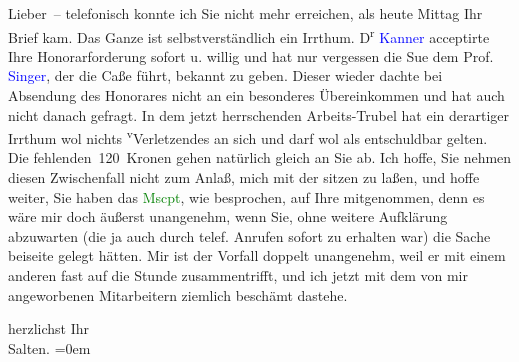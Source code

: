 \pstart
           Lieber – telefonisch konnte ich Sie nicht mehr erreichen, als heute{ }Mittag Ihr Brief kam. Das Ganze ist selbstverständlich ein Irrthum. D\textsuperscript{r}{ }\textcolor{blue}{Kanner}{}\ledrightnote{\textcolor{blue}{Heinrich Kanner}} acceptirte \label{K_L03333-1v}\label{K_L03333-1h} Ihre Honorarforderung sofort u. willig und hat nur vergessen die Su{\geminationm}e dem Prof. \textcolor{blue}{Singer}{}\ledrightnote{\textcolor{blue}{Isidor Singer}}, der die Caße führt, bekannt zu geben. Dieser wieder dachte bei
               Absendung des Honorares nicht an ein besonderes Übereinkommen und hat auch nicht
               danach gefragt. In dem jetzt herrschenden Arbeits-Trubel hat ein derartiger Irrthum
               wol nichts \substVorne{}\textsuperscript{v}\substDazwischen{}V\substHinten{}erletzendes an sich und darf wol als entschuldbar gelten. Die
               fehlenden 120 Kronen gehen natürlich gleich an Sie ab. Ich hoffe, Sie nehmen diesen
               Zwischenfall nicht zum Anlaß, mich mit der \label{K_L03333-2v}\label{K_L03333-2h} sitzen zu laßen, und hoffe weiter, Sie haben das \textcolor{green}{Mscpt}{}\ledrightnote{{$\rightarrow$}\textcolor{green}{Die griechische Tänzerin. Novellette}}, wie besprochen, auf Ihre
                  \label{K_L03333-3v}\label{K_L03333-3h} mitgenommen, denn
               es wäre mir doch äußerst unangenehm, wenn Sie, ohne weitere Aufklärung abzuwarten
               (die ja auch durch telef. Anrufen sofort zu erhalten war) die Sache beiseite gelegt
               hätten. Mir ist der Vorfall doppelt unangenehm, weil er mit einem anderen fast auf
               die Stunde zusammentrifft, und ich jetzt mit dem von mir angeworbenen Mitarbeitern
               ziemlich beschämt dastehe.\pend
           
\pstart
           herzlichst Ihr {\\[\baselineskip]}\spacefill\mbox{Salten.}\pend
           \leftskip=0em{}\endnumbering{}  
      